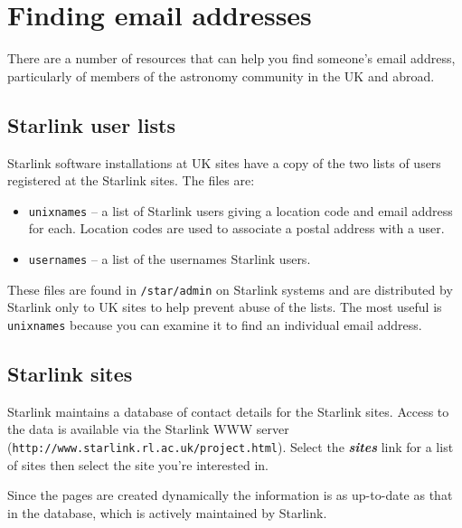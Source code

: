 \documentclass[twoside,11pt]{article}
\newcommand{\htmladdnormallink}[2]{#1}
\newcommand{\latex}[1]{#1}
\newcommand{\xlabel}[1]{}
\renewcommand{\_}{\texttt{\symbol{95}}}
\begin{document}
\section{\xlabel{finding_email_addresses}Finding email addresses}
\label{finding_email_addresses}

There are a number of resources that can help you find someone's email 
address, particularly of members of the astronomy community in the UK and 
abroad.  

\subsection{\xlabel{starlink_user_lists}Starlink user lists}
Starlink software installations at UK sites have a copy of the two lists
of users registered at the Starlink sites.  The files are:

\begin{itemize}

\item \texttt{unixnames} -- a list of Starlink users giving a location
code and email address for each.  Location codes are used to associate
a postal address with a user.

\item \texttt{usernames} -- a list of the usernames Starlink users.

\end{itemize}

These files are found in \texttt{/star/admin} on Starlink systems and
are distributed by Starlink only to UK sites to help prevent abuse of
the lists.  The most useful is \texttt{unixnames} because you can
examine it to find an individual email address.

\subsection{\xlabel{starlink_sites}Starlink sites}
\label{starlink_sites}

Starlink maintains a database of contact details for the Starlink
sites.  Access to the data is available via the
\htmladdnormallink{Starlink WWW
server}{http://www.starlink.rl.ac.uk/project.html}
\latex{(\texttt{http://www.starlink.rl.ac.uk/project.html})}.
Select the \textbf{\textit{sites}} link for a list of sites then select
the site you're interested in.

Since the pages are created dynamically the information is as
up-to-date as that in the database, which is actively maintained by
Starlink.
\end{document}
